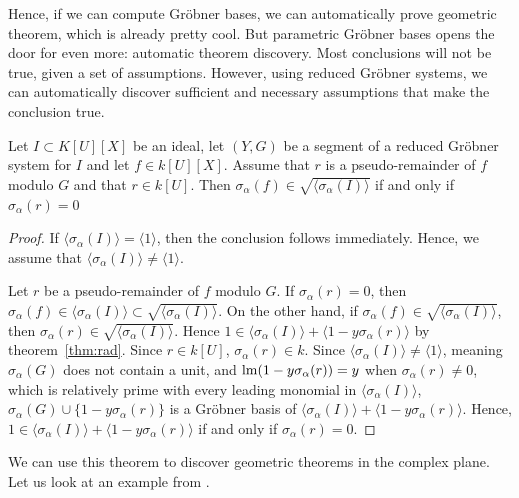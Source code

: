 Hence, if we can compute Gröbner bases, we can automatically prove geometric theorem, which is already pretty cool. But parametric Gröbner bases opens the door for even more: automatic theorem discovery. Most conclusions will not be true, given a set of assumptions. However, using reduced Gröbner systems, we can automatically discover sufficient and necessary assumptions that make the conclusion true.

\begin{theorem}
  Let $I \subset K[U][X]$ be an ideal, let $(Y, G)$ be a segment of a reduced Gröbner system for $I$ and let $f \in k[U][X]$. Assume that $r$ is a pseudo-remainder of $f$ modulo $G$ and that $r \in k[U]$. Then $\sigma_{\alpha}(f) \in \sqrt{\langle \sigma_{\alpha}(I) \rangle}$ if and only if $\sigma_{\alpha}(r) = 0$
\end{theorem}
\begin{proof}
  If $\langle \sigma_{\alpha}(I) \rangle = \langle 1 \rangle$, then the conclusion follows immediately. Hence, we assume that $\langle \sigma_{\alpha}(I) \rangle \neq \langle 1 \rangle$.

  Let $r$ be a pseudo-remainder of $f$ modulo $G$. If $\sigma_{\alpha}(r) = 0$, then $\sigma_{\alpha}(f) \in \langle \sigma_{\alpha}(I) \rangle \subset \sqrt{\langle \sigma_{\alpha}(I) \rangle}$. On the other hand, if $\sigma_{\alpha}(f) \in \sqrt{\langle \sigma_{\alpha}(I) \rangle}$, then $\sigma_{\alpha}(r) \in \sqrt{\langle \sigma_{\alpha}(I) \rangle} $. Hence $1 \in \langle \sigma_{\alpha}(I) \rangle + \langle 1 - y \sigma_{\alpha}(r) \rangle$ by theorem~\ref{thm:rad}. Since $r \in k[U]$, $\sigma_{\alpha}(r) \in k$. Since $\langle \sigma_{\alpha}(I) \rangle \neq \langle 1 \rangle$, meaning $\sigma_{\alpha}(G)$ does not contain a unit, and $\operatorname{lm}(1 - y \sigma_{\alpha}(r)) = y$ when $\sigma_{\alpha}(r) \neq 0$, which is relatively prime with every leading monomial in $\langle \sigma_{\alpha}(I) \rangle$, $\sigma_{\alpha}(G) \cup \{1 - y \sigma_{\alpha}(r)\}$ is a Gröbner basis of $\langle \sigma_{\alpha}(I) \rangle + \langle 1 - y \sigma_{\alpha}(r) \rangle$. Hence, $1 \in \langle \sigma_{\alpha}(I) \rangle + \langle 1 - y \sigma_{\alpha}(r) \rangle$ if and only if $\sigma_{\alpha}(r) = 0$.
\end{proof}

We can use this theorem to discover geometric theorems in the complex plane. Let us look at an example from \cite{MONTES20101391}.


